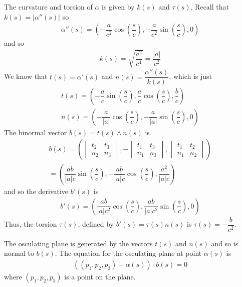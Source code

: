 \documentclass{article}
\begin{document}
	The curvature and torsion of $\alpha$ is given by $k(s)$ and $\tau(s)$. Recall that $k(s) = |\alpha''(s)|$ so
	\begin{gather*}
		\alpha''(s) = \left( -\dfrac{a}{c^2} \cos \left( \dfrac{s}{c} \right), -\dfrac{a}{c^2} \sin \left( \dfrac{s}{c} \right), 0 \right)
	\end{gather*}
	and so
	\begin{gather*}
		k(s) = \sqrt{ \dfrac{a^2}{c^4} } = \dfrac{|a|}{c^2}
	\end{gather*}
	We know that $t(s) = \alpha'(s)$ and $n(s) = \dfrac{\alpha''(s)}{k(s)}$, which is just
	\begin{gather*}
		t(s) = \left( -\dfrac{a}{c} \sin \left( \dfrac{s}{c} \right), \dfrac{a}{c} \cos \left( \dfrac{s}{c} \right), \dfrac{b}{c} \right) \\
		n(s) = \left( -\dfrac{a}{|a|} \cos \left( \dfrac{s}{c} \right), -\dfrac{a}{|a|} \sin \left( \dfrac{s}{c} \right), 0 \right)
	\end{gather*}
	The binormal vector $b(s) = t(s) \wedge n(s)$ is
	\begin{gather*}
		b(s) = \left(
		\begin{vmatrix}
			t_2 & t_3 \\
			n_2 & n_3
		\end{vmatrix}, 
		-\begin{vmatrix}
			t_1 & t_3 \\
			n_1 & n_3
		\end{vmatrix},
		\begin{vmatrix}
			t_1 & t_2 \\
			n_1 & n_2
		\end{vmatrix}
		\right) \\
		= \left(
		\dfrac{ab}{|a|c} \sin \left( \dfrac{s}{c} \right),
		-\dfrac{ab}{|a|c} \cos \left( \dfrac{s}{c} \right),
		\dfrac{a^2}{|a|c}
		\right)
	\end{gather*}
	and so the derivative $b'(s)$ is
	\begin{gather*}
		b'(s) 
		= \left(
		\dfrac{ab}{|a|c^2} \cos \left( \dfrac{s}{c} \right),
		\dfrac{ab}{|a|c^2} \sin \left( \dfrac{s}{c} \right),
		0
		\right)
	\end{gather*}
	Thus, the torsion $\tau(s)$, defined by $b'(s) = \tau(s) n(s)$ is $\tau(s) = - \dfrac{b}{c^2}$.
	
	The osculating plane is generated by the vectors $t(s)$ and $n(s)$ and so is normal to $b(s)$. The equation for the osculating plane at point $\alpha(s)$ is
	\begin{gather*}
		\left( (p_1, p_2, p_3) - \alpha(s) \right) \cdot b(s) = 0
	\end{gather*}
	where $(p_1, p_2, p_3)$ is a point on the plane.
	
\end{document}
